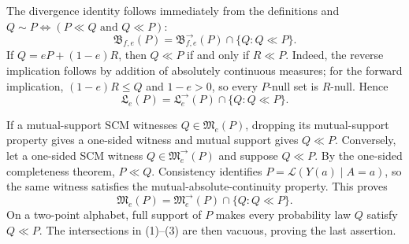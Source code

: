 The divergence identity follows immediately from the definitions and \(Q\sim P\iff(P\ll Q\text{ and }Q\ll P)\):
\[
 \mathfrak B_{f,e}(P)=\mathfrak B^{\to}_{f,e}(P)\cap\{Q:Q\ll P\}. \tag{1}
\]
If \(Q=eP+(1-e)R\), then \(Q\ll P\) if and only if \(R\ll P\).  Indeed, the reverse implication follows by addition of absolutely continuous measures; for the forward implication, \((1-e)R\le Q\) and \(1-e>0\), so every \(P\)-null set is \(R\)-null.  Hence
\[
 \mathfrak L_e(P)=\mathfrak L^{\to}_e(P)\cap\{Q:Q\ll P\}. \tag{2}
\]

If a mutual-support SCM witnesses \(Q\in\mathfrak M_e(P)\), dropping its mutual-support property gives a one-sided witness and mutual support gives \(Q\ll P\).  Conversely, let a one-sided SCM witness \(Q\in\mathfrak M^{\to}_e(P)\) and suppose \(Q\ll P\).  By the one-sided completeness theorem, \(P\ll Q\).  Consistency identifies \(P=\mathcal L(Y(a)\mid A=a)\), so the same witness satisfies the mutual-absolute-continuity property.  This proves
\[
 \mathfrak M_e(P)=\mathfrak M^{\to}_e(P)\cap\{Q:Q\ll P\}. \tag{3}
\]
On a two-point alphabet, full support of \(P\) makes every probability law \(Q\) satisfy \(Q\ll P\).  The intersections in (1)--(3) are then vacuous, proving the last assertion.